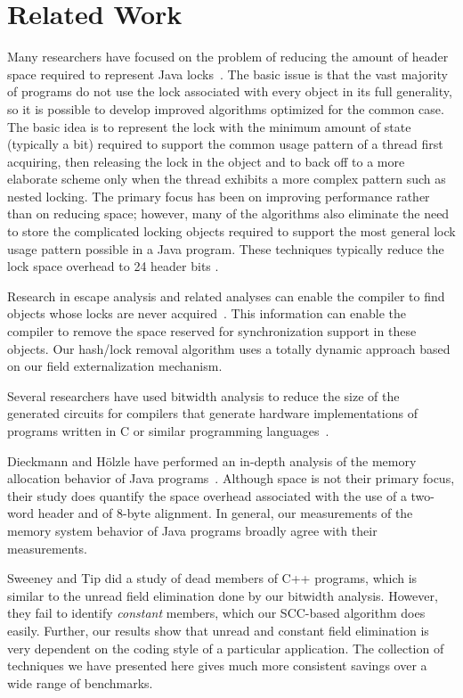 \documentclass[oribibl]{llncs}
\begin{document}
\section{Related Work}
%
Many researchers have focused on the problem of reducing the amount of
header space required to represent Java
locks~\cite{bacon98,OK99,ADGKRW99}. The basic issue is that the vast
majority of programs do not use the lock associated with every object
in its full generality, so it is possible to develop improved
algorithms optimized for the common case.
The basic idea is to represent the lock with the minimum amount
of state (typically a bit) required to support the common usage
pattern of a thread first acquiring, then releasing the lock in the
object and to back off to a more elaborate scheme only when the thread
exhibits a more complex pattern such as nested locking. The
primary focus has been on improving performance rather than on
reducing space; however, many of the algorithms also eliminate the
need to store the complicated locking objects required to support the
most general lock usage pattern possible in a Java program. These
techniques typically reduce the lock space overhead to 24 header bits
\cite{bacon98}.

Research in escape analysis and related analyses can enable the
compiler to find objects whose locks are never 
acquired~\cite{ACSE99,BH99,WR99:OOPSLA99,CGSSM99,Ruf00:PLDI00,SR01:PPOPP01}.
This information can enable the compiler to remove the space
reserved for synchronization support in these objects. 
Our hash/lock removal algorithm uses a totally dynamic approach
based on our field externalization mechanism. 

Several researchers have used bitwidth analysis to reduce the size
of the generated circuits for compilers that generate hardware
implementations of programs written in C or similar programming 
languages~\cite{ananian:siliconc,RR00:PLDI00,SBA00:PLDI00,BGSW00}.

Dieckmann and H\"olzle have performed an in-depth analysis of the
memory allocation behavior of Java programs~\cite{DH99}. Although 
space is not their primary focus, their study does quantify 
the space overhead associated with the use of a two-word header
and of 8-byte alignment. In general, our measurements of the 
memory system behavior of Java programs broadly agree with their
measurements. 

Sweeney and Tip \cite{SweeneyTip98DeadDataMembers} did a study of dead
members of C++ programs, which is similar to the unread field
elimination done by our bitwidth analysis.  However, they
fail to identify {\it constant} members, which our SCC-based algorithm
does easily.  Further, our results show that unread and constant field
elimination is very dependent on the coding style of a particular
application.  The collection of techniques we have presented here
gives much more consistent savings over a wide range of benchmarks.
\end{document}
